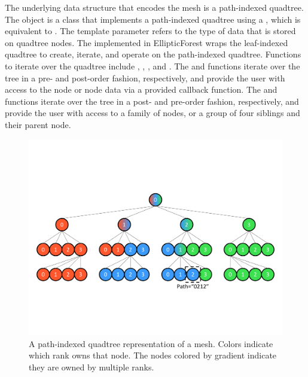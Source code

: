 The underlying data structure that encodes the mesh is a path-indexed quadtree. The  object is a class that implements a path-indexed quadtree using a , which is equivalent to . The template parameter  refers to the type of data that is stored on quadtree nodes. The  implemented in EllipticForest wraps the  leaf-indexed quadtree to create, iterate, and operate on the path-indexed quadtree. Functions to iterate over the quadtree include , , , and . The  and  functions iterate over the tree in a pre- and post-order fashion, respectively, and provide the user with access to the node or node data via a provided callback function. The  and  functions iterate over the tree in a post- and pre-order fashion, respectively, and provide the user with access to a family of nodes, or a group of four siblings and their parent node.

\begin{figure}
    \centering
    \includegraphics[width=\textwidth, clip=true, trim={0 100 0 100}]{figures/parallel_path_indexed_tree.pdf}
    \caption{A path-indexed quadtree representation of a mesh. Colors indicate which rank owns that node. The nodes colored by gradient indicate they are owned by multiple ranks.}
    \label{fig:parallel_quadtree}
\end{figure}

